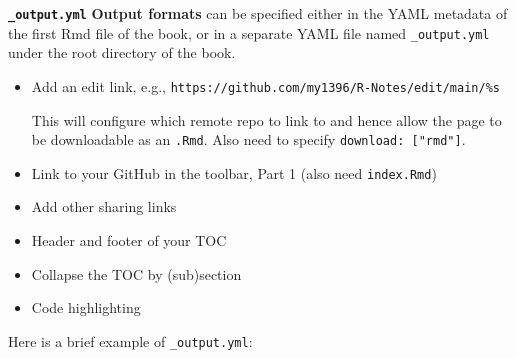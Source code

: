 \documentclass[
]{book}
\theoremstyle{definition}
\theoremstyle{definition}
\theoremstyle{definition}
\theoremstyle{definition}
\theoremstyle{remark}
\begin{document}
\textbf{\texttt{\_output.yml}} \textbf{Output formats} can be specified either in the YAML metadata of the first Rmd file of the book, or in a separate YAML file named \texttt{\_output.yml} under the root directory of the book.

\begin{itemize}
\item
  Add an edit link, e.g., \texttt{https://github.com/my1396/R-Notes/edit/main/\%s}

  This will configure which remote repo to link to and hence allow the page to be downloadable as an \texttt{.Rmd}. Also need to specify \texttt{download:\ {[}"rmd"{]}}.
\item
  Link to your GitHub in the toolbar, Part 1 (also need \texttt{index.Rmd})
\item
  Add other sharing links
\item
  Header and footer of your TOC
\item
  Collapse the TOC by (sub)section
\item
  Code highlighting
\end{itemize}

Here is a brief example of \texttt{\_output.yml}:
\end{document}
